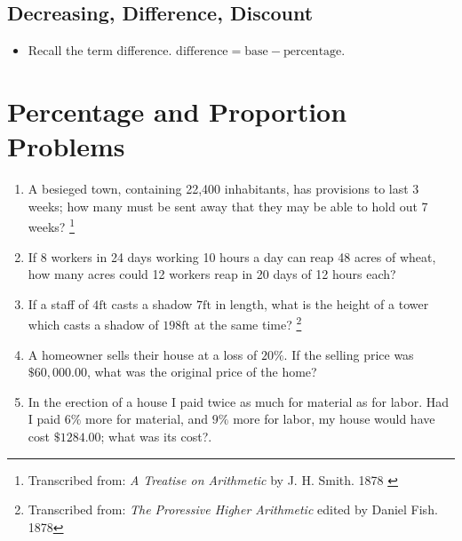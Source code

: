 \documentclass{article}
\begin{document}
\subsection*{Decreasing, Difference, Discount}
\begin{itemize}
\item Recall the term difference.  $\mathrm{difference} = \mathrm{base} - \mathrm{percentage}$.
\end{itemize}

\section*{Percentage and Proportion Problems}
\begin{enumerate}
  \item A besieged town, containing 22,400 inhabitants, has provisions to last 3 weeks; how many must be sent away that they may be able to hold out 7 weeks? \footnote{Transcribed from: {\em A Treatise on Arithmetic} by J. H. Smith. 1878 \label{fn:treatise}}
  \item  If 8 workers in 24 days working 10 hours a day can reap 48 acres of wheat, how many acres could 12 workers reap in 20 days of 12 hours each?
  \item If a staff of $4\mathrm{ft}$ casts a shadow $7\mathrm{ft}$ in length, what is the height of a tower which casts a shadow of $198\mathrm{ft}$ at the same time? \footnote{Transcribed from: {\em The Proressive Higher Arithmetic} edited by Daniel Fish. 1878\label{fn:higher}}
  \item A homeowner sells their house at a loss of $20\%$.  If the selling price was 
  $\$60,000.00$, what was the original price of the home?
  \item In the erection of a house I paid twice as much for material as for labor.  Had I paid $6\%$ more for material, and $9\%$ more for labor, my house would have cost $\$1284.00$; what was its cost?\footnotemark[\ref{fn:higher}].
\end{enumerate}
\end{document}
